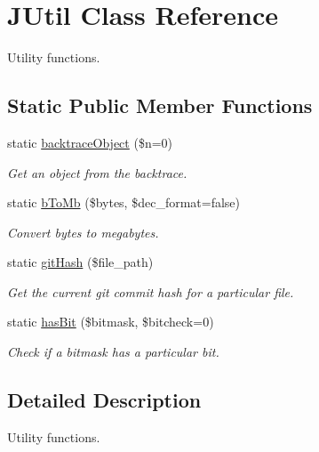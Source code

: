 \hypertarget{classJUtil}{\section{J\-Util Class Reference}
\label{classJUtil}
}


Utility functions.  


\subsection*{Static Public Member Functions}
\begin{DoxyCompactItemize}
\item 
static \hyperlink{classJUtil_a22d6f7d23be18309ff2aeef44016d996}{backtrace\-Object} (\$n=0)
\begin{DoxyCompactList}\small\item\em Get an object from the backtrace. \end{DoxyCompactList}\item 
static \hyperlink{classJUtil_a9380a3827cd535ca26dd975f9e678064}{b\-To\-Mb} (\$bytes, \$dec\-\_\-format=false)
\begin{DoxyCompactList}\small\item\em Convert bytes to megabytes. \end{DoxyCompactList}\item 
static \hyperlink{classJUtil_a608cdaf871165586627efaf67f1017a1}{git\-Hash} (\$file\-\_\-path)
\begin{DoxyCompactList}\small\item\em Get the current git commit hash for a particular file. \end{DoxyCompactList}\item 
static \hyperlink{classJUtil_a764089c0e54c1b10c1fd2c49a2ea31e9}{has\-Bit} (\$bitmask, \$bitcheck=0)
\begin{DoxyCompactList}\small\item\em Check if a bitmask has a particular bit. \end{DoxyCompactList}\end{DoxyCompactItemize}


\subsection{Detailed Description}
Utility functions. 

